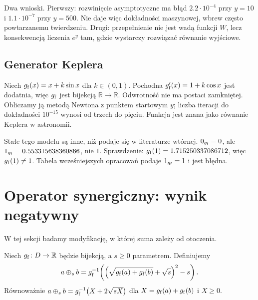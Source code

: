 \documentclass[11pt,a4paper]{article}
\begin{document}
Dwa wnioski. Pierwszy: rozwinięcie asymptotyczne ma błąd $2.2\cdot10^{-4}$ przy
$y=10$ i $1.1\cdot10^{-7}$ przy $y=500$. Nie daje więc dokładności maszynowej,
wbrew często powtarzanemu twierdzeniu. Drugi: przepełnienie nie jest
wadą funkcji $W$, lecz konsekwencją liczenia $e^{y}$ tam, gdzie wystarczy
rozwiązać równanie wyjściowe.

\subsection{Generator Keplera}

Niech $g_{\mathrm{f}}(x)=x+k\sin x$ dla $k\in(0,1)$. Pochodna $g_{\mathrm{f}}'(x)=1+k\cos x$ jest
dodatnia, więc $g_{\mathrm{f}}$ jest bijekcją $\mathbb{R}\to\mathbb{R}$. Odwrotność nie ma
postaci zamkniętej. Obliczamy ją metodą Newtona z punktem startowym $y$;
liczba iteracji do dokładności $10^{-15}$ wynosi od trzech do pięciu.
Funkcja jest znana jako równanie Keplera w astronomii.

Stałe tego modelu są inne, niż podaje się w literaturze wtórnej.
$0_{g_{\mathrm{f}}}=0$, ale $1_{g_{\mathrm{f}}}=0.553315638360866$, nie $1$. Sprawdzenie:
$g_{\mathrm{f}}(1)=1.715250337086712$, więc $g_{\mathrm{f}}(1)\neq1$. Tabela wcześniejszych
opracowań podaje $1_{g_{\mathrm{f}}}=1$ i jest błędna.

\section{Operator synergiczny: wynik negatywny}

W tej sekcji badamy modyfikację, w której suma zależy od otoczenia.

\begin{definition}
\label{def:synergy}
Niech $g_{\mathrm{f}}\colon D\to\mathbb{R}$ będzie bijekcją, a $s\ge0$ parametrem.
Definiujemy
\begin{equation}
\label{eq:synergy}
a\mathbin{\oplus}_{s}b=g_{\mathrm{f}}^{-1}\!\left(\Big(\sqrt{g_{\mathrm{f}}(a)+g_{\mathrm{f}}(b)}+\sqrt{s}\Big)^{2}-s\right).
\end{equation}
Równoważnie $a\mathbin{\oplus}_{s}b=g_{\mathrm{f}}^{-1}\big(X+2\sqrt{sX}\big)$ dla
$X=g_{\mathrm{f}}(a)+g_{\mathrm{f}}(b)$ i $X\ge0$.
\end{definition}
\end{document}
